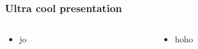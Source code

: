 \begin{frame}
   \frametitle{Ultra cool presentation}
   \begin{columns}[t, onlytextwidth]
      \begin{column}[T]{0.5\textwidth}
         \begin{itemize}
            \item jo
         \end{itemize}
      \end{column}
      \begin{column}[T]{0.49\textwidth}
         \begin{itemize}
            \item hoho
         \end{itemize}
      \end{column}
   \end{columns}
\end{frame}